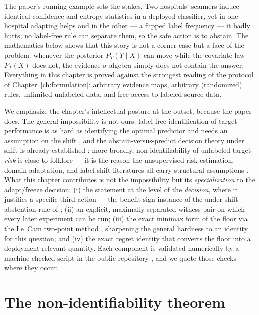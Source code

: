 The paper's running example sets the stakes. Two hospitals' scanners induce
identical confidence and entropy statistics in a deployed classifier, yet in
one hospital adapting helps and in the other --- a flipped label frequency
--- it badly hurts; no label-free rule can separate them, so the safe action
is to abstain. The mathematics below shows that this story is not a corner
case but a face of the problem: whenever the posterior $P_T(Y\mid X)$ can
move while the covariate law $P_T(X)$ does not, the evidence
$\sigma$-algebra simply does not contain the answer. Everything in this
chapter is proved against the strongest reading of the protocol of
Chapter~\ref{ch:formulation}: arbitrary evidence maps, arbitrary
(randomized) rules, unlimited unlabeled data, and free access to labeled
source data.

We emphasize the chapter's intellectual posture at the outset, because the
paper does. The general impossibility is not ours: label-free identification of
target performance is as hard as identifying the optimal predictor and needs an
assumption on the shift \cite{garg2022atc}, and the abstain-versus-predict decision
theory under shift is already established \cite{kalai2021abstain}; more broadly,
non-identifiability of unlabeled target \emph{risk} is close to folklore --- it is
the reason the unsupervised risk estimation, domain adaptation, and label-shift
literatures all carry structural assumptions \cite{bendavid2010theory,
mansour2009domain, lipton2018detecting}. What this chapter contributes is not the
impossibility but its \emph{specialization} to the adapt/freeze decision: (i) the
statement at the level of the \emph{decision}, where it justifies a specific third
action --- the benefit-sign instance of the under-shift abstention rule of
\cite{kalai2021abstain}; (ii) an explicit, maximally separated witness pair on which
every later experiment can be run; (iii) the exact minimax form of the floor via
the Le~Cam two-point method \cite{lecam1973convergence,
tsybakov2009introduction}, sharpening the general hardness to an identity for this
question; and (iv) the exact regret identity that converts the floor into a
deployment-relevant quantity. Each component is validated numerically by a
machine-checked script in the public repository \cite{kbound2026repo}, and we quote
those checks where they occur.

\section{The non-identifiability theorem}\label{sec:t1-imp}

